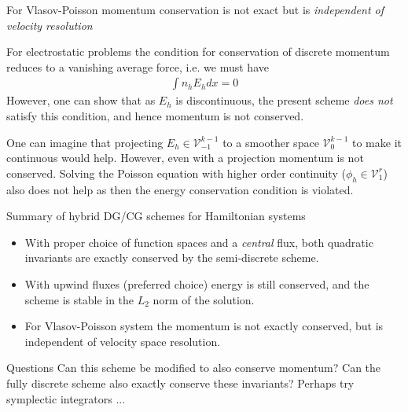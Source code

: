 \documentclass[pdf]{beamer}
\theoremstyle{definition}
\begin{document}
\begin{frame}{For Vlasov-Poisson momentum conservation is not exact
    but is \emph{independent of velocity resolution}}%

  For electrostatic problems the condition for conservation of
  discrete momentum reduces to a vanishing average force, i.e. we must
  have
  \begin{align*}
    \int n_h E_h dx = 0
  \end{align*}
  However, one can show that as $E_h$ is discontinuous, the present
  scheme \emph{does not} satisfy this condition, and hence momentum is
  not conserved.

  One can imagine that projecting $E_h \in \mathcal{V}_{-1}^{k-1}$ to
  a smoother space $\mathcal{V}_0^{k-1}$ to make it continuous would
  help. However, even with a projection momentum is not
  conserved. Solving the Poisson equation with higher order continuity
  ($\phi_h \in \mathcal{V}_1^r$) also does not help as then the energy
  conservation condition is violated.
\end{frame}

\begin{frame}{Summary of hybrid DG/CG schemes for Hamiltonian systems}

  \begin{itemize}
  \item With proper choice of function spaces and a \emph{central}
    flux, both quadratic invariants are exactly conserved by the
    semi-discrete scheme.
  \item With upwind fluxes (preferred choice) energy is still
    conserved, and the scheme is stable in the $L_2$ norm of the
    solution.
  \item For Vlasov-Poisson system the momentum is not exactly
    conserved, but is independent of velocity space resolution.
  \end{itemize}
  \begin{block}{Questions}
    Can this scheme be modified to also conserve momentum? Can the
    fully discrete scheme also exactly conserve these invariants?
    Perhaps try symplectic integrators ...
  \end{block}

\end{frame}
\end{document}
